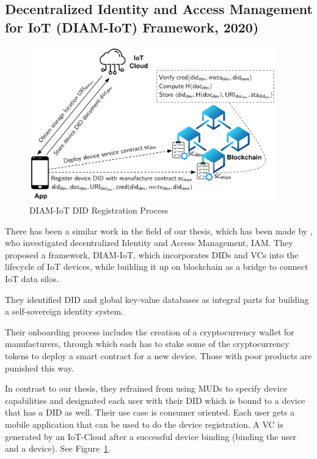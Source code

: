 
\subsection{Decentralized Identity and Access Management for IoT (DIAM-IoT) Framework, 2020)} %
\label{sub:Decentralized Identity and Access Management for IoT}

\begin{figure}
	\begin{center}
		\includegraphics[width=0.95\textwidth]{figures/diam-iot-did-registration.png}
	\end{center}
	\caption{DIAM-IoT DID Registration Process \cite{diam-iot-2020}}
	\label{fig:diam-iot-did-registration}
\end{figure}

There has been a similar work in the field of our thesis, which has been made by \cite{diam-iot-2020}, who investigated
decentralized Identity and Access Management, IAM. They proposed a framework, DIAM-IoT, which incorporates DIDs and VCs
into the lifecycle of IoT devices, while building it up on blockchain as a bridge to connect IoT data silos.

They identified DID and global key-value databases as integral parts for building a self-sovereign identity system.

Their onboarding process includes the creation of a cryptocurrency wallet for manufacturers, through which each has to
stake some of the cryptocurrency tokens to deploy a smart contract for a new device. Those with poor products are
punished this way.

In contrast to our thesis, they refrained from using MUDs to specify device capabilities and designated each user with
their DID which is bound to a device that has a DID as well. Their use case is consumer oriented. Each user gets a
mobile application that can be used to do the device registration. A VC is generated by an IoT-Cloud after a successful
device binding (binding the user and a device). See Figure~\ref{fig:diam-iot-did-registration}.

